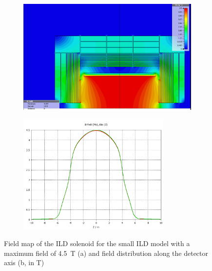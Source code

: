 \begin{figure}[t]
\begin{center}
\begin{subfigure}{0.9\hsize} \includegraphics[width=\textwidth]{Integration/fig/field_small_4_5.png}
\caption{ \label{ild:fig:magnet_small_map}}
 \end{subfigure}
\hspace{0.03\textwidth}
\begin{subfigure}{0.9\hsize} \includegraphics[width=\textwidth, height = 6cm]{Integration/fig/field_small_4_5_plot.png}
\caption{  \label{ild:fig:magnet_small_field}}
 \end{subfigure}
\end{center}
\caption{Field map of the ILD solenoid for the small ILD model with a maximum field of 4.5~T (a) and field distribution along the detector axis (b, in T)~\cite{ild:bib:Magnet_Simulations}}
\label{ILD:fig:magnet_small}
\end{figure}



